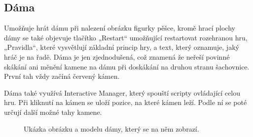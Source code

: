 \documentclass[12pt, a4paper,
twoside,        %
openright
]{report}
\begin{document}
\newpage

\subsection{Dáma}	
Umožňuje hrát dámu při nalezení obrázku figurky pěšce, kromě hrací plochy dámy se také objevuje tlačítko „Restart“ umožňující restartovat rozehranou hru, „Pravidla“, které vysvětlují základní princip hry, a text, který oznamuje, jaký hráč je na řadě. Dáma je jen zjednodušená, což znamená že neřeší povinné skákání ani měnění kamene na dámu při doskákání na druhou stranu šachovnice. První tah vždy začíná červený kámen.  

Dáma také využívá Interactive Manager, který spouští scripty ovládající celou hru. Při kliknutí na kámen se uloží pozice, na které kámen leží. Podle ní se poté určují další možné tahy kamene. 


\begin{figure}[H]
	\centering
	\qquad
	\caption{Ukázka obrázku a modelu dámy, který se na něm zobrazí.}
	\label{fig:checkers}
\end{figure}
\end{document}
